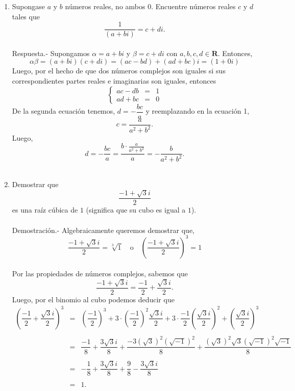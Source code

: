 \begin{enumerate}[\bfseries 1.]

    \item Supongase $a$ y $b$ números reales, no ambos $0$. Encuentre números reales $c$ y $d$ tales que
    $$\dfrac{1}{(a+bi)}=c+di.$$\\
	Respuesta.-\; Supongamos $\alpha=a+bi$ y $\beta=c+di$ con $a,b,c,d\in \textbf{R}$. Entonces,
	$$\alpha\beta = (a+bi)(c+di) = (ac-bd)+(ad+bc)i=(1+0i)$$
	Luego, por el hecho de que dos números complejos son iguales si sus correspondientes partes reales e imaginarias son iguales, entonces
	$$\left\{\begin{array}{rcl}
	    ac-db & = & 1\\
	    ad+bc & = & 0
	\end{array}\right.$$
	De la segunda ecuación tenemos, $d=-\dfrac{bc}{a}$ y reemplazando en la ecuación 1, 
	$$c=\dfrac{a}{a^2+b^2}.$$
	Luego,
	$$d=-\dfrac{bc}{a}=\dfrac{b\cdot \frac{a}{a^2+b^2}}{a}=-\dfrac{b}{a^2+b^2}.$$\\

    \item Demostrar que 
    $$\dfrac{-1+\sqrt{3}i}{2}$$
    es una raíz cúbica de $1$ (significa que su cubo es igual a $1$).\\\\
	Demostración.-\; Algebraicamente queremos demostrar que,
	$$\dfrac{-1+\sqrt{3}i}{2}=\sqrt[3]{1} \quad \mbox{o}\quad \left(\dfrac{-1+\sqrt{3}i}{2}\right)^3=1$$\\
	Por las propiedades de números complejos, sabemos que
	$$\dfrac{-1+\sqrt{3}i}{2}=\dfrac{-1}{2}+\dfrac{\sqrt{3}i}{2}.$$
	Luego, por el binomio al cubo podemos deducir que
	$$\begin{array}{rcl}
	    \left(\dfrac{-1}{2}+\dfrac{\sqrt{3}i}{2}\right)^3 &=&\left(\dfrac{-1}{2}\right)^3 + 3\cdot \left(\dfrac{-1}{2}\right)^2 \dfrac{\sqrt{3}i}{2} + 3\cdot \dfrac{-1}{2}\left(\dfrac{\sqrt{3}i}{2}\right)^2+\left(\dfrac{\sqrt{3}i}{2}\right)^3\\\\
							      &=&\dfrac{-1}{8}+\dfrac{3\sqrt{3}i}{8}+\dfrac{-3(\sqrt{3})^2(\sqrt{-1})^2}{8}+\dfrac{(\sqrt{3})^2\sqrt{3}(\sqrt{-1})^2\sqrt{-1}}{8}\\\\
							      &=&-\dfrac{1}{8}+\dfrac{3\sqrt{3}i}{8}+\dfrac{9}{8}-\dfrac{3\sqrt{3}i}{8}\\\\
							      &=&1.
	\end{array}$$
	\vspace{0.5cm}


\end{enumerate}
